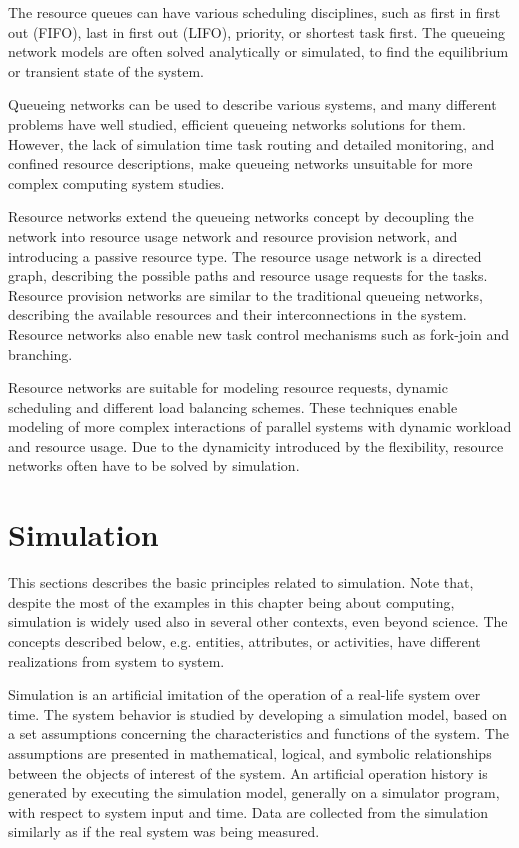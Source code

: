 The resource queues can have various scheduling disciplines, such as first in first out (FIFO), last in first out (LIFO), priority, or shortest task first. The queueing network models are often solved analytically or simulated, to find the equilibrium or transient state of the system. ~\cite{Bolch:2006:Queueing}

Queueing networks can be used to describe various systems, and many different problems have well studied, efficient queueing networks solutions for them. However, the lack of simulation time task routing and detailed monitoring, and confined resource descriptions, make queueing networks unsuitable for more complex computing system studies.~\cite{Bolch:2006:Queueing}

Resource networks extend the queueing networks concept by decoupling the network into resource usage network and resource provision network, and introducing a passive resource type. The resource usage network is a directed graph, describing the possible paths and resource usage requests for the tasks. Resource provision networks are similar to the traditional queueing networks, describing the available resources and their interconnections in the system. Resource networks also enable new task control mechanisms such as fork-join and branching. ~\cite{Menasce:1994:CPP}

Resource networks are suitable for modeling resource requests, dynamic scheduling and different load balancing schemes. These techniques enable modeling of more complex interactions of parallel systems with dynamic workload and resource usage. Due to the dynamicity introduced by the flexibility, resource networks often have to be solved by simulation.~\cite{Menasce:1994:CPP}

\section{Simulation}
This sections describes the basic principles related to simulation. Note that, despite the most of the examples in this chapter being about computing, simulation is widely used also in several other contexts, even beyond science. The concepts described below, e.g. entities, attributes, or activities, have different realizations from system to system.

Simulation is an artificial imitation of the operation of a real-life system over time. The system behavior is studied by developing a simulation model, based on a set assumptions concerning the characteristics and functions of the system. The assumptions are presented in mathematical, logical, and symbolic relationships between the objects of interest of the system. An artificial operation history is generated by executing the simulation model, generally on a simulator program, with respect to system input and time. Data are collected from the simulation similarly as if the real system was being measured.

